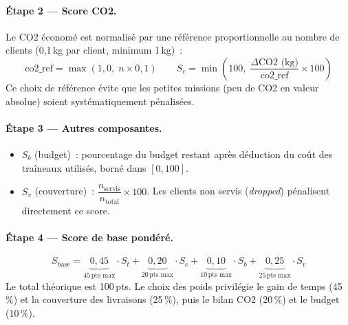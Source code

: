 \documentclass[a4paper, 12pt, twoside]{article}
\begin{document}
\paragraph{\'Etape 2 --- Score CO2.}
Le CO2 \'{e}conom\'{e} est normalis\'{e} par une r\'{e}f\'{e}rence proportionnelle au nombre
de clients (0,1\,kg par client, minimum 1\,kg)~:
\[
  \text{co2\_ref} = \max(1{,}0,\; n \times 0{,}1)
  \qquad
  S_c = \min\!\left(100,\; \frac{\Delta\text{CO2 (kg)}}{\text{co2\_ref}} \times 100\right)
\]
Ce choix de r\'{e}f\'{e}rence \'{e}vite que les petites missions (peu de CO2 en valeur absolue)
soient syst\'{e}matiquement p\'{e}nalis\'{e}es.

\paragraph{\'Etape 3 --- Autres composantes.}
\begin{itemize}
  \item $S_b$ (budget)~: pourcentage du budget restant apr\`{e}s d\'{e}duction du co\^{u}t
        des tra\^{i}neaux utilis\'{e}s, born\'{e} dans $[0, 100]$.
  \item $S_v$ (couverture)~: $\dfrac{n_{\text{servis}}}{n_{\text{total}}} \times 100$.
        Les clients non servis (\textit{dropped}) p\'{e}nalisent directement ce score.
\end{itemize}

\paragraph{\'Etape 4 --- Score de base pond\'{e}r\'{e}.}
\[
  S_{\text{base}} = \underbrace{0{,}45}_{45\,\text{pts max}} \cdot S_t
                  + \underbrace{0{,}20}_{20\,\text{pts max}} \cdot S_c
                  + \underbrace{0{,}10}_{10\,\text{pts max}} \cdot S_b
                  + \underbrace{0{,}25}_{25\,\text{pts max}} \cdot S_v
\]
Le total th\'{e}orique est 100\,pts. Le choix des poids privil\'{e}gie le gain de temps
(45\,\%) et la couverture des livraisons (25\,\%), puis le bilan CO2 (20\,\%) et
le budget (10\,\%).
\end{document}
